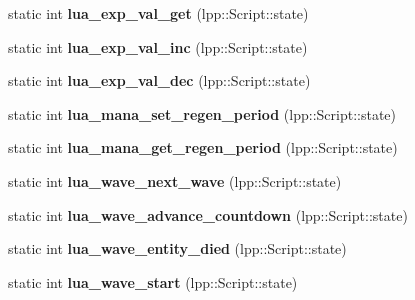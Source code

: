 \begin{DoxyCompactItemize}
\item 
static int {\bfseries lua\+\_\+exp\+\_\+val\+\_\+get} (lpp\+::\+Script\+::state)\hypertarget{class_lua_interface_a85a7ef9826ccf41d6370bc401951b2c3}{}\label{class_lua_interface_a85a7ef9826ccf41d6370bc401951b2c3}

\item 
static int {\bfseries lua\+\_\+exp\+\_\+val\+\_\+inc} (lpp\+::\+Script\+::state)\hypertarget{class_lua_interface_aa03e9a4fcde2b82263af0f5cf6189699}{}\label{class_lua_interface_aa03e9a4fcde2b82263af0f5cf6189699}

\item 
static int {\bfseries lua\+\_\+exp\+\_\+val\+\_\+dec} (lpp\+::\+Script\+::state)\hypertarget{class_lua_interface_ae83e1919ecf5939f262881fc45751041}{}\label{class_lua_interface_ae83e1919ecf5939f262881fc45751041}

\item 
static int {\bfseries lua\+\_\+mana\+\_\+set\+\_\+regen\+\_\+period} (lpp\+::\+Script\+::state)\hypertarget{class_lua_interface_a7d3970489610f699bdfdf02770ecbaa3}{}\label{class_lua_interface_a7d3970489610f699bdfdf02770ecbaa3}

\item 
static int {\bfseries lua\+\_\+mana\+\_\+get\+\_\+regen\+\_\+period} (lpp\+::\+Script\+::state)\hypertarget{class_lua_interface_a944009ddffe0bcd3b58ebddde6938e38}{}\label{class_lua_interface_a944009ddffe0bcd3b58ebddde6938e38}

\item 
static int {\bfseries lua\+\_\+wave\+\_\+next\+\_\+wave} (lpp\+::\+Script\+::state)\hypertarget{class_lua_interface_ada2750b1d7931d2fae044ecbba18cd0f}{}\label{class_lua_interface_ada2750b1d7931d2fae044ecbba18cd0f}

\item 
static int {\bfseries lua\+\_\+wave\+\_\+advance\+\_\+countdown} (lpp\+::\+Script\+::state)\hypertarget{class_lua_interface_a81e99172f69ced4dde4ad1cbff155051}{}\label{class_lua_interface_a81e99172f69ced4dde4ad1cbff155051}

\item 
static int {\bfseries lua\+\_\+wave\+\_\+entity\+\_\+died} (lpp\+::\+Script\+::state)\hypertarget{class_lua_interface_a3a440b9226f1ef34d1146d5e47150c14}{}\label{class_lua_interface_a3a440b9226f1ef34d1146d5e47150c14}

\item 
static int {\bfseries lua\+\_\+wave\+\_\+start} (lpp\+::\+Script\+::state)\hypertarget{class_lua_interface_acb07a9592f9227e0faf1ca01514a6a4e}{}\label{class_lua_interface_acb07a9592f9227e0faf1ca01514a6a4e}


\end{DoxyCompactItemize}
